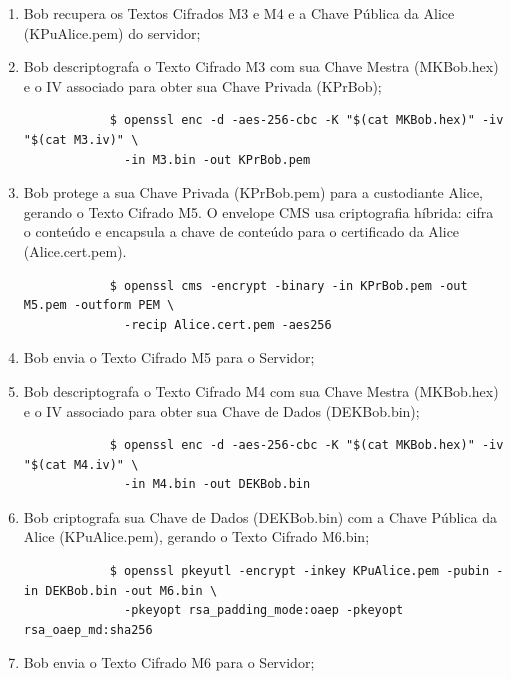 \documentclass[12pt]{article}
\begin{document}
\begin{enumerate}
	\item Bob recupera os Textos Cifrados M3 e M4 e a Chave Pública da Alice (KPuAlice.pem) do servidor;
	\item Bob descriptografa o Texto Cifrado M3 com sua Chave Mestra (MKBob.hex) e o IV associado para obter sua Chave Privada (KPrBob);
	\begin{tcolorbox}[width=\textwidth]
		{\scriptsize
			\begin{verbatim}
			$ openssl enc -d -aes-256-cbc -K "$(cat MKBob.hex)" -iv "$(cat M3.iv)" \
			  -in M3.bin -out KPrBob.pem
			\end{verbatim}
		}
	\end{tcolorbox}
	\item Bob protege a sua Chave Privada (KPrBob.pem) para a custodiante Alice, gerando o Texto Cifrado M5. O envelope CMS usa criptografia híbrida: cifra o conteúdo e encapsula a chave de conteúdo para o certificado da Alice (Alice.cert.pem).
	\begin{tcolorbox}[width=\textwidth]
		{\scriptsize
			\begin{verbatim}
			$ openssl cms -encrypt -binary -in KPrBob.pem -out M5.pem -outform PEM \
			  -recip Alice.cert.pem -aes256
			\end{verbatim}
		}
	\end{tcolorbox}
	\item Bob envia o Texto Cifrado M5 para o Servidor;
	\item Bob descriptografa o Texto Cifrado M4 com sua Chave Mestra (MKBob.hex) e o IV associado para obter sua Chave de Dados (DEKBob.bin);
	\begin{tcolorbox}[width=\textwidth]
		{\scriptsize
			\begin{verbatim}
			$ openssl enc -d -aes-256-cbc -K "$(cat MKBob.hex)" -iv "$(cat M4.iv)" \
			  -in M4.bin -out DEKBob.bin
			\end{verbatim}
		}
	\end{tcolorbox}
	\item Bob criptografa sua Chave de Dados (DEKBob.bin) com a Chave Pública da Alice (KPuAlice.pem), gerando o Texto Cifrado M6.bin;
	\begin{tcolorbox}[width=\textwidth]
		{\scriptsize
			\begin{verbatim}
			$ openssl pkeyutl -encrypt -inkey KPuAlice.pem -pubin -in DEKBob.bin -out M6.bin \
			  -pkeyopt rsa_padding_mode:oaep -pkeyopt rsa_oaep_md:sha256
			\end{verbatim}
		}
	\end{tcolorbox}	
	\item Bob envia o Texto Cifrado M6 para o Servidor;
\end{enumerate}
\end{document}
